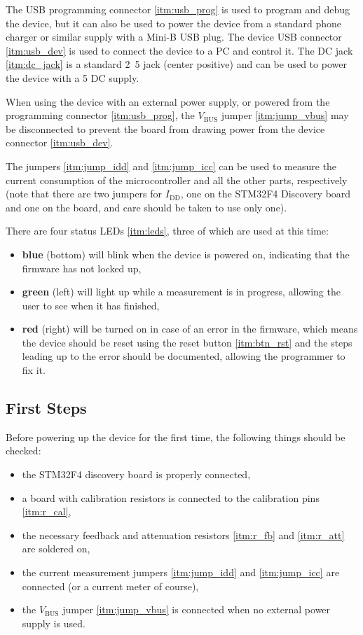 The USB programming connector \ref{itm:usb_prog} is used to program and debug the device, but it can also be used to
power the device from a standard phone charger or similar supply with a Mini-B USB plug.
The device USB connector \ref{itm:usb_dev} is used to connect the device to a PC and control it.
The DC jack \ref{itm:dc_jack} is a standard \unit{2.5}{\milli\meter} jack (center positive) and can be used to
power the device with a \unit{5}{\volt} DC supply.

When using the device with an external power supply, or powered from the programming connector \ref{itm:usb_prog},
the $ V_\text{BUS} $ jumper \ref{itm:jump_vbus} may be disconnected to prevent the board from drawing power from the
device connector \ref{itm:usb_dev}.

The jumpers \ref{itm:jump_idd} and \ref{itm:jump_icc} can be used to measure the current consumption of the
microcontroller and all the other parts, respectively (note that there are two jumpers for $ I_\text{DD} $,
one on the STM32F4 Discovery board and one on the board, and care should be taken to use only one).

There are four status LEDs \ref{itm:leds}, three of which are used at this time:
\begin{itemize}
	\item \textbf{\color{blue} blue} (bottom) will blink when the device is powered on, indicating that the firmware
    has not locked up,
  \item \textbf{\color{OliveGreen} green} (left) will light up while a measurement is in progress, allowing the user
    to see when it has finished,
  \item \textbf{\color{red} red} (right) will be turned on in case of an error in the firmware, which means the device
    should be reset using the reset button \ref{itm:btn_rst} and the steps leading up to the error should be
    documented, allowing the programmer to fix it.
\end{itemize}

\subsection{First Steps}

Before powering up the device for the first time, the following things should be checked:
\begin{itemize}
	\item the STM32F4 discovery board is properly connected,
  \item a board with calibration resistors is connected to the calibration pins \ref{itm:r_cal},
  \item the necessary feedback and attenuation resistors \ref{itm:r_fb} and \ref{itm:r_att} are soldered on,
  \item the current measurement jumpers \ref{itm:jump_idd} and \ref{itm:jump_icc} are connected
    (or a current meter of course),
  \item the $ V_\text{BUS} $ jumper \ref{itm:jump_vbus} is connected when no external power supply is used.
\end{itemize}

